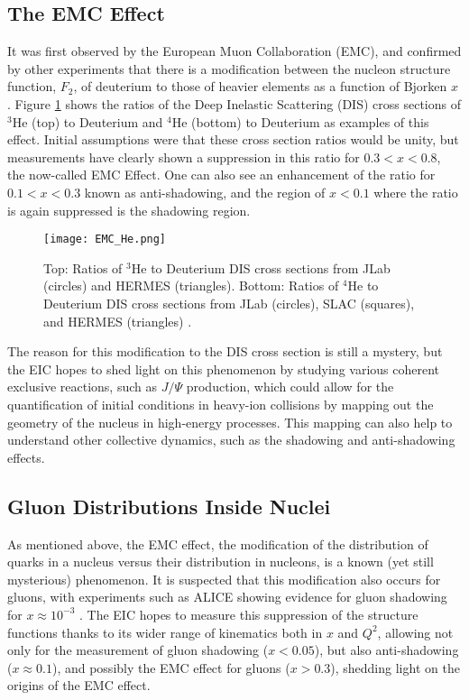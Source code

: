 \subsection{The EMC Effect}
It was first observed by the European Muon Collaboration (EMC), and confirmed by other experiments that there is a modification between the nucleon structure function, $F_2$, of deuterium to those of heavier elements as a function of Bjorken $x$ \cite{SRC_EMC_effect}. Figure \ref{fig:emc_effect} shows the ratios of the Deep Inelastic Scattering (DIS) cross sections of ${}^3$He (top) to Deuterium and ${}^4$He (bottom) to Deuterium as examples of this effect. Initial assumptions were that these cross section ratios would be unity, but measurements have clearly shown a suppression in this ratio for $0.3 < x < 0.8$, the now-called EMC Effect. One can also see an enhancement of the ratio for $0.1 < x < 0.3$ known as anti-shadowing, and the region of $x < 0.1$ where the ratio is again suppressed is the shadowing region.

\begin{figure}[ht]
	\centering
	\texttt{[image: EMC\_He.png]}
	\caption{Top: Ratios of ${}^3$He to Deuterium DIS cross sections from JLab (circles) and HERMES (triangles). Bottom: Ratios of ${}^4$He to Deuterium DIS cross sections from JLab (circles), SLAC (squares), and HERMES (triangles) \cite{EMC_Challenge}.}
	\label{fig:emc_effect}
\end{figure}

The reason for this modification to the DIS cross section is still a mystery, but the EIC hopes to shed light on this phenomenon by studying various coherent exclusive reactions, such as $J/\Psi$ production, which could allow for the quantification of initial conditions in heavy-ion collisions by mapping out the geometry of the nucleus in high-energy processes. This mapping can also help to understand other collective dynamics, such as the shadowing and anti-shadowing effects.

\subsection{Gluon Distributions Inside Nuclei}
As mentioned above, the EMC effect, the modification of the distribution of quarks in a nucleus versus their distribution in nucleons, is a known (yet still mysterious) phenomenon. It is suspected that this modification also occurs for gluons, with experiments such as ALICE showing evidence for gluon shadowing for $x \approx 10^{-3}$ \cite{ALICE_antishadowing}. The EIC hopes to measure this suppression of the structure functions thanks to its wider range of kinematics both in $x$ and $Q^2$, allowing not only for the measurement of gluon shadowing ($x < 0.05$), but also anti-shadowing ($x \approx 0.1$), and possibly the EMC effect for gluons ($x > 0.3$), shedding light on the origins of the EMC effect.

